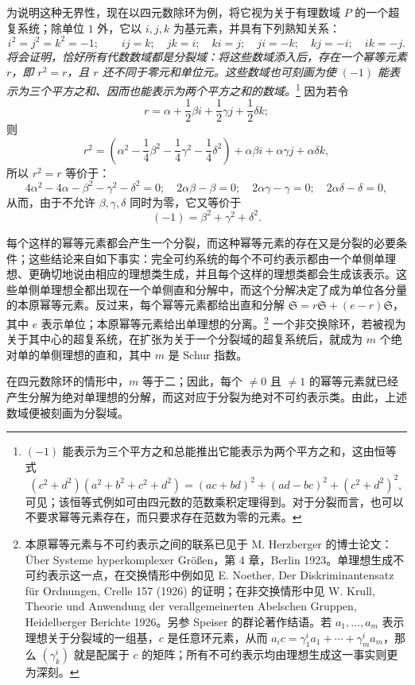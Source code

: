 \documentclass[11pt]{article}
\providecommand{\srcspaced}[1]{\emph{#1}}
\providecommand{\mS}{\mathfrak{S}}
\begin{document}
为说明这种无界性，现在以四元数除环为例，将它视为关于有理数域 $P$ 的一个超复系统；除单位 $1$ 外，它以 $i,j,k$ 为基元素，并具有下列熟知关系：
\[
 i^2=j^2=k^2=-1;\qquad ij=k;\quad jk=i;\quad ki=j;\quad ji=-k;\quad kj=-i;\quad ik=-j.
\]
\srcspaced{将会证明，恰好所有代数数域都是分裂域：将这些数域添入后，存在一个\guillemotright{}幂等\guillemotleft{}元素 $r$，即 $r^2=r$，且 $r$ 还不同于零元和单位元。这些数域也可刻画为使 $(-1)$ 能表示为三个平方之和、因而也能表示为两个平方之和的数域。}\footnote{$(-1)$ 能表示为三个平方之和总能推出它能表示为两个平方之和，这由恒等式
\[
(c^2+d^2)(a^2+b^2+c^2+d^2)=(ac+bd)^2+(ad-bc)^2+(c^2+d^2)^2,
\]
可见；该恒等式例如可由四元数的范数乘积定理得到。对于分裂而言，也可以不要求幂等元素存在，而只要求存在范数为零的元素。} 因为若令
\[
        r=\alpha+\frac12\beta i+\frac12\gamma j+\frac12\delta k;
\]
则
\[
        r^2=\left(\alpha^2-\frac14\beta^2-\frac14\gamma^2-\frac14\delta^2\right)
          +\alpha\beta i+\alpha\gamma j+\alpha\delta k,
\]
所以 $r^2=r$ 等价于：
\[
4\alpha^2-4\alpha-\beta^2-\gamma^2-\delta^2=0;\quad
2\alpha\beta-\beta=0;\quad 2\alpha\gamma-\gamma=0;\quad 2\alpha\delta-\delta=0,
\]
从而，由于不允许 $\beta,\gamma,\delta$ 同时为零，它又等价于
\[
        (-1)=\beta^2+\gamma^2+\delta^2.
\]

每个这样的幂等元素都会产生一个分裂，而这种幂等元素的存在又是分裂的必要条件；这些结论来自如下事实：完全可约系统的每个不可约表示都由一个单侧单理想、更确切地说由相应的理想类生成，并且每个这样的理想类都会生成该表示。这些单侧单理想全都出现在一个单侧直和分解中，而这个分解决定了成为单位各分量的\guillemotright{}本原\guillemotleft{}幂等元素。反过来，每个幂等元素都给出直和分解 $\mS=r\mS+(e-r)\mS$，其中 $e$ 表示单位；\guillemotright{}本原\guillemotleft{}幂等元素给出单理想的分离。\footnote{本原幂等元素与不可约表示之间的联系已见于 M. Herzberger 的博士论文：Über Systeme hyperkomplexer Größen，第 4 章，Berlin 1923。单理想生成不可约表示这一点，在交换情形中例如见 E. Noether, Der Diskriminantensatz für Ordnungen, Crelle 157 (1926) 的证明；在非交换情形中见 W. Krull, Theorie und Anwendung der verallgemeinerten Abelschen Gruppen, Heidelberger Berichte 1926。另参 Speiser 的群论著作结语。若 $a_1,\ldots,a_m$ 表示理想关于分裂域的一组基，$c$ 是任意环元素，从而 $a_i c=\gamma^i_1 a_1+\cdots+\gamma^i_m a_m$，那么 $(\gamma^i_k)$ 就是配属于 $c$ 的矩阵；所有不可约表示均由理想生成这一事实则更为深刻。} 一个非交换除环，若被视为关于其中心的超复系统，在扩张为关于一个分裂域的超复系统后，就成为 $m$ 个绝对单的单侧理想的直和，其中 $m$ 是 Schur 指数。

在四元数除环的情形中，$m$ 等于二；因此，每个 $\ne0$ 且 $\ne1$ 的幂等元素就已经产生分解为绝对单理想的分解，而这对应于分裂为绝对不可约表示类。由此，上述数域便被刻画为分裂域。
\end{document}
